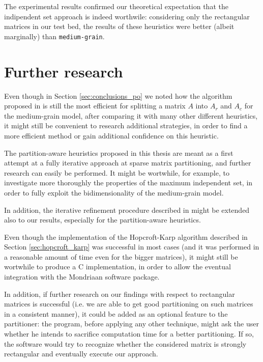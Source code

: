 The experimental results confirmed our theoretical expectation that the indipendent set approach is indeed worthwile: considering only the rectangular matrices in our test bed, the results of these heuristics were better (albeit marginally) than \verb|medium-grain|.

\section{Further research}

Even though in Section \ref{sec:conclusions_po} we noted how the algorithm proposed in \cite{mediumgrain} is still the most efficient for splitting a matrix $A$ into $A_r$ and $A_c$ for the medium-grain model, after comparing it with many other different heuristics, it might still be convenient to research additional strategies, in order to find a more efficient method or gain additional confidence on this heuristic.

The partition-aware heuristics proposed in this thesis are meant as a first attempt at a fully iterative approach at sparse matrix partitioning, and further research can easily be performed. It might be wortwhile, for example, to investigate more thoroughly the properties of the maximum independent set, in order to fully exploit the bidimensionality of the medium-grain model.

In addition, the iterative refinement procedure described in \cite{mediumgrain} might be extended also to our results, especially for the partition-aware heuristics.

Even though the implementation of the Hopcroft-Karp algorithm described in Section \ref{sec:hopcroft_karp} was successful in most cases (and it was performed in a reasonable amount of time even for the bigger matrices), it might still be wortwhile to produce a C implementation, in order to allow the eventual integration with the Mondriaan software package. 

In addition, if further research on our findings with respect to rectangular matrices is successful (i.e. we are able to get good partitioning on such matrices in a consistent manner), it could be added as an optional feature to the partitioner: the program, before applying any other technique, might ask the user whether he intends to sacrifice computation time for a better partitioning. If so, the software would try to recognize whether the considered matrix is strongly rectangular and eventually execute our approach.

